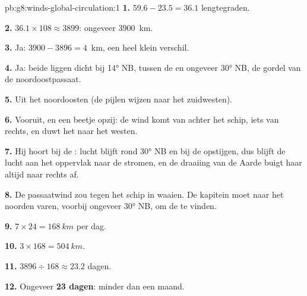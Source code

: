 \begin{solution}{pb:g8:winds-global-circulation:1}
\textbf{1.} $59.6 - 23.5 = 36.1$ lengtegraden.

\textbf{2.} $36.1 \times 108 \approx 3899$: ongeveer \qty{3900}{km}.

\textbf{3.} Ja: $3900 - 3896 = 4$~km, een heel klein verschil.

\textbf{4.} Ja: beide liggen dicht bij \ang{14} NB, tussen de  en
ongeveer \ang{30} NB, de gordel van de noordoostpassaat.

\textbf{5.} Uit het noordoosten (de pijlen wijzen naar het
zuidwesten).

\textbf{6.} Vooruit, en een beetje opzij: de wind komt van achter het
schip, iets van rechts, en duwt het naar het westen.

\textbf{7.} Hij hoort bij de : lucht blijft rond
\ang{30} NB  en bij de  opstijgen, dus blijft de lucht aan het
oppervlak naar de  stromen, en de draaiing van de Aarde buigt haar
altijd naar rechts af.

\textbf{8.} De passaatwind zou tegen het schip in waaien. De kapitein moet
naar het noorden varen, voorbij ongeveer \ang{30} NB, om de  te
vinden.

\textbf{9.} $7 \times 24 = \qty{168}{km}$ per dag.

\textbf{10.} $3 \times 168 = \qty{504}{km}$.

\textbf{11.} $3896 \div 168 \approx 23.2$ dagen.

\textbf{12.} Ongeveer \textbf{23 dagen}: minder dan een maand.
\end{solution}
